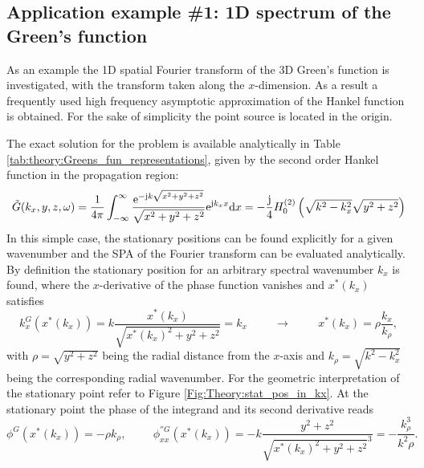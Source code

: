 \subsection*{Application example \#1: 1D spectrum of the Green's function}
\label{sec:greens_function_spectrum}

As an example the 1D spatial Fourier transform of the 3D Green's function is investigated, with the transform taken along the $x$-dimension.
As a result a frequently used high frequency asymptotic approximation of the Hankel function is obtained.
For the sake of simplicity the point source is located in the origin.

The exact solution for the problem is available analytically in Table \eqref{tab:theory:Greens_fun_representations}, given by the second order Hankel function in the propagation region:
\begin{equation}
\tilde{G}(k_x,y,z,\omega) = \frac{1}{4\pi} \int_{-\infty}^{\infty} \frac{\mathrm{e}^{-\mathrm{j} k \sqrt{x^2 + y^2 + z^2}}}{\sqrt{x^2 + y^2 + z^2}} \mathrm{e}^{\mathrm{j} k_x x} \mathrm{d} x = 
-\frac{\mathrm{j}}{4} H_0^{(2)}\left( \sqrt{k^2- k_x^2} \sqrt{y^2 + z^2} \right)
\label{Eq:HF_approx:Greens_spectrum_defintion}
\end{equation}
In this simple case, the stationary positions can be found explicitly for a given wavenumber and the SPA of the Fourier transform can be evaluated analytically. 
By definition the stationary position for an arbitrary spectral wavenumber $k_x$ is found, where the $x$-derivative of the phase function vanishes and $x^*(k_x)$ satisfies
\begin{equation}
k^G_x(x^*(k_x)) = 
k \frac{x^*(k_x)}{\sqrt{x^*(k_x)^2 + y^2 + z^2}} = k_x 
\hspace{1cm} \rightarrow \hspace{1cm} 
x^*(k_x) = \rho \frac{k_x}{k_{\rho}},
\label{eq:HF_approx:greens_spectrum_stat_point}
\end{equation}
with $\rho = \sqrt{y^2+z^2}$ being the radial distance from the $x$-axis and $k_{\rho} = \sqrt	{k^2-k_x^2}$ being the corresponding radial wavenumber.
For the geometric interpretation of the stationary point refer to Figure \ref{Fig:Theory:stat_pos_in_kx}.
At the stationary point the phase of the integrand and its second derivative reads
\begin{equation}
\phi^{G}(x^*(k_x)) = - \rho k_{\rho}, \hspace{1cm}
\phi^{''G}_{xx}(x^*(k_x)) =  -k \frac{y^2+z^2}{\sqrt{ x^*(k_x)^2 +y^2+z^2 }^3} = - \frac{k_{\rho}^3}{k^2 \rho}.
\end{equation}
